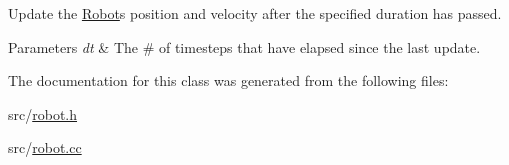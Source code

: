 Update the \mbox{\hyperlink{class_robot}{Robot}}\textquotesingle{}s position and velocity after the specified duration has passed. 


\begin{DoxyParams}{Parameters}
{\em dt} & The \# of timesteps that have elapsed since the last update. \\
\hline
\end{DoxyParams}


The documentation for this class was generated from the following files\+:\begin{DoxyCompactItemize}
\item 
src/\mbox{\hyperlink{robot_8h}{robot.\+h}}\item 
src/\mbox{\hyperlink{robot_8cc}{robot.\+cc}}\end{DoxyCompactItemize}
